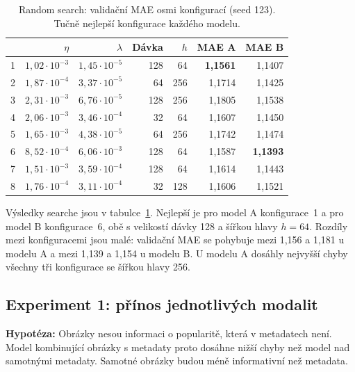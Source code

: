 \begin{table}[h]
    \centering
    \begin{tabular}{crrrrrr}
        \toprule
        & $\eta$ & $\lambda$ & Dávka & $h$ & MAE A & MAE B \\
        \midrule
        1 & $1{,}02 \cdot 10^{-3}$ & $1{,}45 \cdot 10^{-5}$ & 128 & 64 & \textbf{1,1561} & 1,1407 \\
        2 & $1{,}87 \cdot 10^{-4}$ & $3{,}37 \cdot 10^{-5}$ & 64 & 256 & 1,1714 & 1,1425 \\
        3 & $2{,}31 \cdot 10^{-3}$ & $6{,}76 \cdot 10^{-5}$ & 128 & 256 & 1,1805 & 1,1538 \\
        4 & $2{,}06 \cdot 10^{-3}$ & $3{,}46 \cdot 10^{-4}$ & 32 & 64 & 1,1607 & 1,1450 \\
        5 & $1{,}65 \cdot 10^{-3}$ & $4{,}38 \cdot 10^{-5}$ & 64 & 256 & 1,1742 & 1,1474 \\
        6 & $8{,}52 \cdot 10^{-4}$ & $6{,}06 \cdot 10^{-3}$ & 128 & 64 & 1,1587 & \textbf{1,1393} \\
        7 & $1{,}51 \cdot 10^{-3}$ & $3{,}59 \cdot 10^{-4}$ & 128 & 64 & 1,1614 & 1,1443 \\
        8 & $1{,}76 \cdot 10^{-4}$ & $3{,}11 \cdot 10^{-4}$ & 32 & 128 & 1,1606 & 1,1521 \\
        \bottomrule
    \end{tabular}
    \caption{Random search: validační MAE osmi konfigurací (seed 123). Tučně nejlepší
    konfigurace každého modelu.}
    \label{tab:search}
\end{table}

Výsledky searche jsou v tabulce~\ref{tab:search}. Nejlepší je pro model A konfigurace~1 a pro
model B konfigurace~6, obě s velikostí dávky 128 a šířkou hlavy $h = 64$. Rozdíly mezi
konfiguracemi jsou malé: validační MAE se pohybuje mezi 1,156 a 1,181 u modelu A a mezi 1,139
a 1,154 u modelu B. U modelu A dosáhly nejvyšší chyby všechny tři konfigurace se šířkou hlavy 256.

\subsection*{Experiment 1: přínos jednotlivých modalit}

\textbf{Hypotéza:} Obrázky nesou informaci o popularitě, která v metadatech není. Model
kombinující obrázky s metadaty proto dosáhne nižší chyby než model nad samotnými metadaty.
Samotné obrázky budou méně informativní než metadata.


